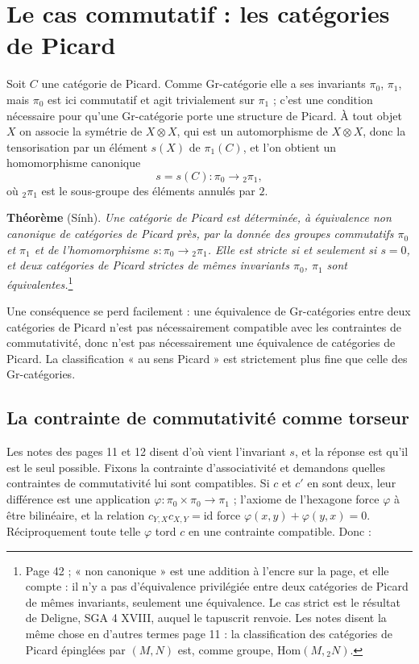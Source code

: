 \documentclass[11pt,a4paper]{article}
\begin{document}
\section*{Le cas commutatif : les catégories de Picard}

Soit $C$ une catégorie de Picard. Comme Gr-catégorie elle a ses invariants
$\pi_{0}$, $\pi_{1}$, mais $\pi_{0}$ est ici commutatif et agit trivialement
sur $\pi_{1}$ ; c'est une condition nécessaire pour qu'une Gr-catégorie porte
une structure de Picard. À tout objet $X$ on associe la symétrie de $X \otimes
X$, qui est un automorphisme de $X \otimes X$, donc la tensorisation par un
élément $s(X)$ de $\pi_{1}(C)$, et l'on obtient un homomorphisme canonique
\[
s = s(C) : \pi_{0} \longrightarrow {}_{2}\pi_{1},
\]
où ${}_{2}\pi_{1}$ est le sous-groupe des éléments annulés par $2$.

\textbf{Théorème} (Sính). \emph{Une catégorie de Picard est déterminée, à
équivalence non canonique de catégories de Picard près, par la donnée des
groupes commutatifs $\pi_{0}$ et $\pi_{1}$ et de l'homomorphisme $s : \pi_{0}
\to {}_{2}\pi_{1}$. Elle est stricte si et seulement si $s = 0$, et deux
catégories de Picard strictes de mêmes invariants $\pi_{0}$, $\pi_{1}$ sont
équivalentes.}\footnote{Page 42 ; « non canonique » est une addition à l'encre
sur la page, et elle compte : il n'y a pas d'équivalence privilégiée entre
deux catégories de Picard de mêmes invariants, seulement une équivalence. Le
cas strict est le résultat de Deligne, SGA 4 XVIII, auquel le tapuscrit
renvoie. Les notes disent la même chose en d'autres termes page 11 : la
classification des catégories de Picard épinglées par $(M,N)$ est, comme
groupe, $\mathrm{Hom}(M, {}_{2}N)$.}

Une conséquence se perd facilement : une
équivalence de Gr-catégories entre deux catégories de Picard n'est pas
nécessairement compatible avec les contraintes de commutativité, donc n'est
pas nécessairement une équivalence de catégories de Picard. La classification
« au sens Picard » est strictement plus fine que celle des Gr-catégories.

\subsection*{La contrainte de commutativité comme torseur}

Les notes des pages 11 et 12 disent d'où vient l'invariant $s$, et la réponse
est qu'il est le seul possible. Fixons la contrainte d'associativité et
demandons quelles contraintes de commutativité lui sont compatibles. Si $c$ et
$c'$ en sont deux, leur différence est une application $\varphi : \pi_{0}
\times \pi_{0} \to \pi_{1}$ ; l'axiome de l'hexagone force $\varphi$ à être
bilinéaire, et la relation $c_{Y,X}c_{X,Y} = \mathrm{id}$ force $\varphi(x,y)
+ \varphi(y,x) = 0$. Réciproquement toute telle $\varphi$ tord $c$ en une
contrainte compatible. Donc :
\end{document}

